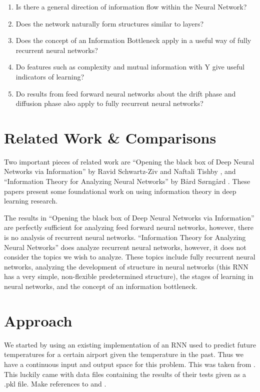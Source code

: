 \begin{enumerate}
	\item Is there a general direction of information flow within the Neural Network?
	\item Does the network naturally form structures similar to layers?
	\item Does the concept of an Information Bottleneck apply in a useful way of fully recurrent neural networks?
	\item Do features such as complexity and mutual information with Y give useful indicators of learning?
	\item Do results from feed forward neural networks about the drift phase and diffusion phase also apply to fully recurrent neural networks?
\end{enumerate}

\section{Related Work \& Comparisons}
Two important pieces of related work are “Opening the black box of Deep Neural
Networks via Information” by Ravid Schwartz-Ziv and Naftali Tishby
\cite{black_box}, and “Information Theory for Analyzing
Neural Networks” by B\aa rd S\o rng\aa rd \cite{ntnu}. These papers present some
foundational work on using information theory in deep learning research.

The results in “Opening the black box of Deep Neural Networks via Information” are perfectly sufficient for analyzing feed forward neural networks, however, there is no analysis of recurrent neural networks. “Information Theory for Analyzing Neural Networks” does analyze recurrent neural networks, however, it does not consider the topics we wish to analyze. These topics include fully recurrent neural networks, analyzing the development of structure in neural networks (this RNN has a very simple, non-flexible predetermined structure), the stages of learning in neural networks, and the concept of an information bottleneck. 

\section{Approach}
We started by using an existing implementation of an RNN used to predict future
temperatures for a certain airport given the temperature in the past. Thus we
have a continuous input and output space for this problem. This was taken from
\cite{weather}. This luckily came with data files containing the results of
their tests given as a .pkl file.
Make references to \cite{disentangling_representations} and
\cite{info_bottleneck}.

